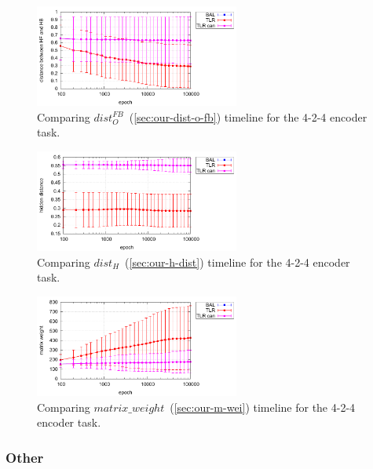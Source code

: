 \begin{figure}[H]
  \centering
  \includegraphics[width=0.6\textwidth]{img/feature-cmp-o-fb-d.pdf}  
   \caption{Comparing $dist_{O}^{FB}$~(\ref{sec:our-dist-o-fb}) timeline for the {4-2-4 encoder} task.}
  \label{fig:results-candidates-o-fb-d}
\end{figure}

\begin{figure}[H]
  \centering
  \includegraphics[width=0.6\textwidth]{img/feature-cmp-h-dist.pdf}  
   \caption{Comparing $dist_{H}$~(\ref{sec:our-h-dist}) timeline for the {4-2-4 encoder} task.}
  \label{fig:results-candidates-h-dist}
\end{figure}

\begin{figure}[H]
  \centering
  \includegraphics[width=0.6\textwidth]{img/feature-cmp-m-wei.pdf}  
   \caption{Comparing $matrix\_weight$~(\ref{sec:our-m-wei}) timeline for the {4-2-4 encoder} task.}
  \label{fig:results-candidates-m-wei}
\end{figure}


\subsubsection{Other}


